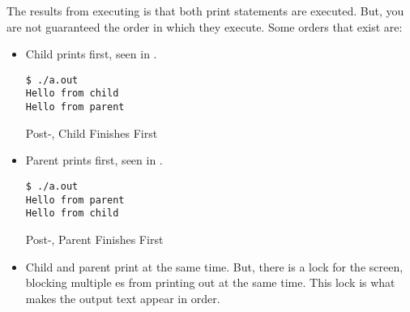 The results from  executing is that both print statements are executed.
But, you are not guaranteed the order in which they execute.
Some orders that exist are:
\begin{itemize}[noitemsep]
\item Child prints first, seen in .
  \begin{listing}[h!tbp]
\begin{verbatim}
$ ./a.out
Hello from child
Hello from parent
\end{verbatim}
\caption{Post-, Child Finishes First}
\label{lst:fork-1-Child_First}
  \end{listing}

\item Parent prints first, seen in .
  \begin{listing}[h!tbp]
\begin{verbatim}
$ ./a.out
Hello from parent
Hello from child
\end{verbatim}
\caption{Post-, Parent Finishes First}
\label{lst:fork-1-Parent_First}
  \end{listing}

\item Child and parent print at the same time.
  But, there is a lock for the screen, blocking multiple es from printing out at the same time.
  This lock is what makes the output text appear in order.
\end{itemize}


